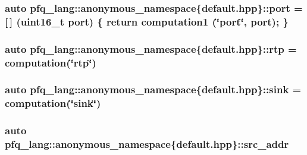 \hypertarget{namespacepfq__lang_1_1anonymous__namespace_02default_8hpp_03_a1b370b44e5eedc364f3bb306d5042738}{
\subsubsection[{port}]{\setlength{\rightskip}{0pt plus 5cm}auto pfq\-\_\-lang\-::anonymous\-\_\-namespace\{default.\-hpp\}\-::port = \mbox{[}$\,$\mbox{]} (uint16\-\_\-t port) \{ return {\bf computation1} (\char`\"{}port\char`\"{}, port); \}}}\label{namespacepfq__lang_1_1anonymous__namespace_02default_8hpp_03_a1b370b44e5eedc364f3bb306d5042738}
\hypertarget{namespacepfq__lang_1_1anonymous__namespace_02default_8hpp_03_a13ac072f4d7f860256ef22d7f5a1a9ac}{
\subsubsection[{rtp}]{\setlength{\rightskip}{0pt plus 5cm}auto pfq\-\_\-lang\-::anonymous\-\_\-namespace\{default.\-hpp\}\-::rtp = {\bf computation}(\char`\"{}rtp\char`\"{})}}\label{namespacepfq__lang_1_1anonymous__namespace_02default_8hpp_03_a13ac072f4d7f860256ef22d7f5a1a9ac}
\hypertarget{namespacepfq__lang_1_1anonymous__namespace_02default_8hpp_03_ad708862e729d0cc6a217d86bb25b1061}{
\subsubsection[{sink}]{\setlength{\rightskip}{0pt plus 5cm}auto pfq\-\_\-lang\-::anonymous\-\_\-namespace\{default.\-hpp\}\-::sink = {\bf computation}(\char`\"{}sink\char`\"{})}}\label{namespacepfq__lang_1_1anonymous__namespace_02default_8hpp_03_ad708862e729d0cc6a217d86bb25b1061}
\hypertarget{namespacepfq__lang_1_1anonymous__namespace_02default_8hpp_03_a63c87ff605d7cefa807fd61bc463785d}{
\subsubsection[{src\-\_\-addr}]{\setlength{\rightskip}{0pt plus 5cm}auto pfq\-\_\-lang\-::anonymous\-\_\-namespace\{default.\-hpp\}\-::src\-\_\-addr}}\label{namespacepfq__lang_1_1anonymous__namespace_02default_8hpp_03_a63c87ff605d7cefa807fd61bc463785d}
